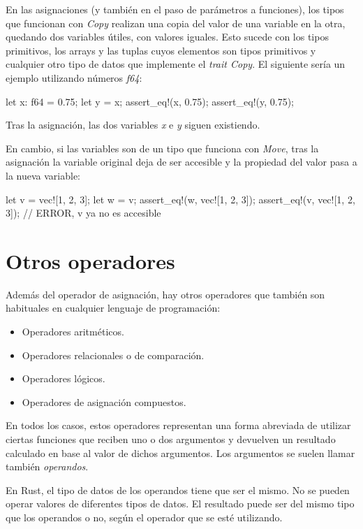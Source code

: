 En las asignaciones (y también en el paso de parámetros a funciones), los tipos que funcionan con \textit{Copy} realizan una copia del valor de una variable en la otra, quedando dos variables útiles, con valores iguales. Esto sucede con los tipos primitivos, los arrays y las tuplas cuyos elementos son tipos primitivos y cualquier otro tipo de datos que implemente el \textit{trait Copy}. El siguiente sería un ejemplo utilizando números \textit{f64}:

\vspace{0.7em}
\begin{Codigo}
let x: f64 = 0.75;
let y = x;
assert_eq!(x, 0.75);
assert_eq!(y, 0.75);
\end{Codigo}

Tras la asignación, las dos variables \textit{x} e \textit{y} siguen existiendo.

En cambio, si las variables son de un tipo que funciona con \textit{Move}, tras la asignación la variable original deja de ser accesible y la propiedad del valor pasa a la nueva variable:

\vspace{0.7em}
\begin{Codigo}
let v = vec![1, 2, 3];
let w = v;
assert_eq!(w, vec![1, 2, 3]);
assert_eq!(v, vec![1, 2, 3]); // ERROR, v ya no es accesible
\end{Codigo}

\section{Otros operadores}
\noindent Además del operador de asignación, hay otros operadores que también son habituales en cualquier lenguaje de programación:

\begin{itemize}
   \item Operadores aritméticos.
   \item Operadores relacionales o de comparación.
   \item Operadores lógicos.
   \item Operadores de asignación compuestos.
\end{itemize}

En todos los casos, estos operadores representan una forma abreviada de utilizar ciertas funciones que reciben uno o dos argumentos y devuelven un resultado calculado en base al valor de dichos argumentos. Los argumentos se suelen llamar también \textit{operandos}.

En Rust, el tipo de datos de los operandos tiene que ser el mismo. No se pueden operar valores de diferentes tipos de datos. El resultado puede ser del mismo tipo que los operandos o no, según el operador que se esté utilizando.

